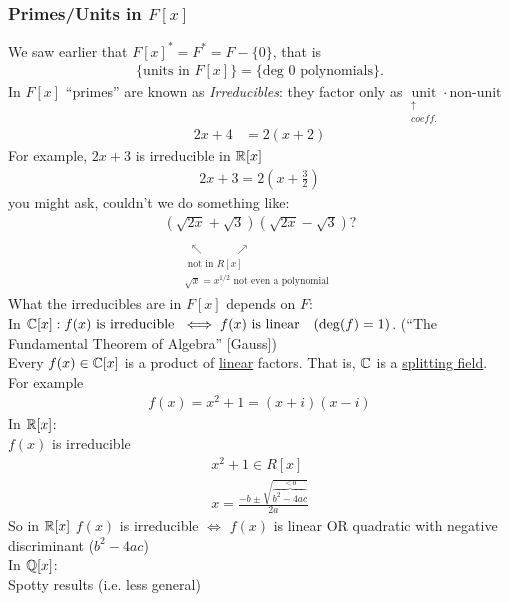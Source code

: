 \subsubsection*{Primes/Units in $F[x]$}
We saw earlier that $F[x]^*=F^* = F-\{0\}$, that is
\begin{align*}
    \{\text{units in }F[x]\}= \{\text{deg }0 \text{ polynomials}\}.
\end{align*}
In $F[x]$ ``primes'' are known as \textit{Irreducibles}: they factor only as
$\underset{\substack{\uparrow \\ coeff.}}{\text{unit}}\cdot\text{non-unit}$
\begin{align*}
    2x+4 &= 2(x+2)
\end{align*}
For example, $2x+3$ is irreducible in ${\mathbb{R}}[x]$
\begin{align*}
    2x+3 = 2\left(x+\frac{3}{2}\right)
\end{align*}
you might ask, couldn't we do something like:
\begin{align*}
    \underset{\substack{\\ \\ \ \ \nwarrow \ \ \ \ \ \ \ \ \ \ \ \ \ \ \nearrow \\ \text{ not in }R[x] \\ \sqrt{x}=x^{1/2} \text{ not even a polynomial}}}{(\sqrt{2x}+\sqrt{3})(\sqrt{2x}-\sqrt{3})} ?
\end{align*}
What the irreducibles are in $F[x]$ depends on $F$:\\
In ${\mathbb{C}}[x]: \\
f(x) \text{ is irreducible } \iff f(x) \text{ is linear } \ \ (\deg(f)
=1)$. (``The Fundamental Theorem of Algebra'' [Gauss]) \\
Every $f(x) \in {\mathbb{C}}[x]$ is a product of \ul{linear} factors. That is, ${\mathbb{C}}$ is a \ul{splitting field}.
\\
For example
\begin{align*}
    f(x)=x^2+1 = (x+i)(x-i)
\end{align*}
In ${\mathbb{R}}[x]$: \\
$f(x)$ is irreducible
\begin{align*}
    x^2+1\in R[x] \\
    x= \frac{-b \pm \sqrt{\overbrace{b^2-4ac}^{<0}}}{2a}
\end{align*}
So in ${\mathbb{R}}[x]$ $f(x)$ is irreducible $\iff$ $f(x)$ is linear OR quadratic with negative discriminant
($b^2-4ac$)\\
\noindent In ${\mathbb{Q}}[x]$: \\
Spotty results (i.e. less general)
